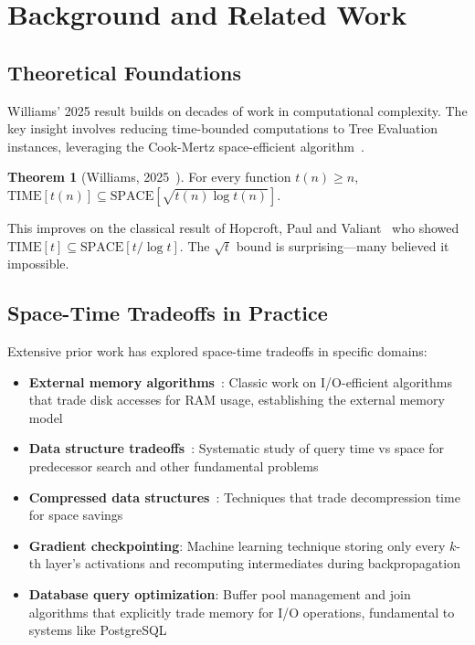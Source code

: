 \documentclass[11pt]{article}
\theoremstyle{definition}
\newtheorem{theorem}{Theorem}
\begin{document}
\section{Background and Related Work}

\subsection{Theoretical Foundations}

Williams' 2025 result builds on decades of work in computational complexity. The key insight involves reducing time-bounded computations to Tree Evaluation instances, leveraging the Cook-Mertz space-efficient algorithm~\cite{cookmertz2024}.

\begin{theorem}[Williams, 2025~\cite{williams2025}]
For every function $t(n) \geq n$,\\
$\text{TIME}[t(n)] \subseteq \text{SPACE}[\sqrt{t(n) \log t(n)}]$.
\end{theorem}

This improves on the classical result of Hopcroft, Paul and Valiant~\cite{hpv1977} who showed $\text{TIME}[t] \subseteq \text{SPACE}[t/\log t]$. The $\sqrt{t}$ bound is surprising---many believed it impossible.

\subsection{Space-Time Tradeoffs in Practice}

Extensive prior work has explored space-time tradeoffs in specific domains:
\begin{itemize}
\item \textbf{External memory algorithms}~\cite{vitter2008}: Classic work on I/O-efficient algorithms that trade disk accesses for RAM usage, establishing the external memory model
\item \textbf{Data structure tradeoffs}~\cite{patrascu2006}: Systematic study of query time vs space for predecessor search and other fundamental problems
\item \textbf{Compressed data structures}~\cite{navarro2016}: Techniques that trade decompression time for space savings
\item \textbf{Gradient checkpointing}: Machine learning technique storing only every $k$-th layer's activations and recomputing intermediates during backpropagation
\item \textbf{Database query optimization}: Buffer pool management and join algorithms that explicitly trade memory for I/O operations, fundamental to systems like PostgreSQL
\end{itemize}
\end{document}
